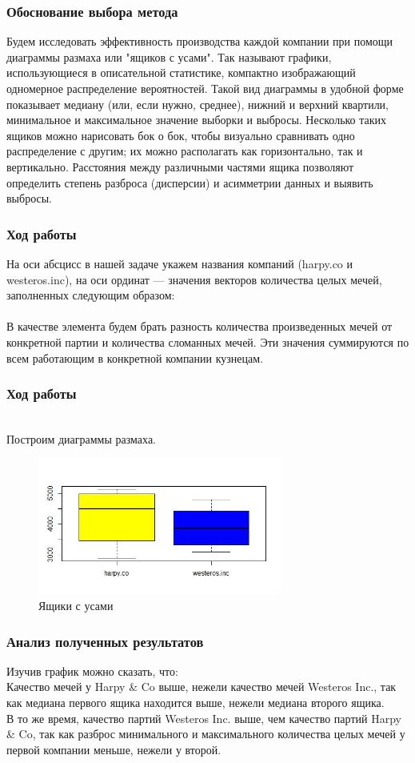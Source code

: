 \documentclass[10pt]{beamer}
\begin{document}
\begin{frame}
\frametitle{Обоснование выбора метода}
Будем исследовать эффективность производства каждой компании при помощи диаграммы размаха или "ящиков с усами". Так называют графики, использующиеся в описательной статистике, компактно изображающий одномерное распределение вероятностей. Такой вид диаграммы в удобной форме показывает медиану (или, если нужно, среднее), нижний и верхний квартили, минимальное и максимальное значение выборки и выбросы. Несколько таких ящиков можно нарисовать бок о бок, чтобы визуально сравнивать одно распределение с другим; их можно располагать как горизонтально, так и вертикально. Расстояния между различными частями ящика позволяют определить степень разброса (дисперсии) и асимметрии данных и выявить выбросы.
\end{frame}

\begin{frame}
\frametitle{Ход работы}
На оси абсцисс в нашей задаче укажем названия компаний (harpy.co и westeros.inc), на оси ординат --- значения векторов количества целых мечей, заполненных следующим образом:\\~\\
В качестве элемента будем брать разность количества произведенных мечей от конкретной партии и количества сломанных мечей. Эти значения суммируются по всем работающим в конкретной компании кузнецам.
\end{frame}

\begin{frame}
\frametitle{Ход работы}
~\\
Построим диаграммы размаха.
\begin{figure}
\includegraphics[width=80mm]{boxes.jpg}
\caption{Ящики с усами}
\label{boxes}
\end{figure}
\end{frame}

\begin{frame}
\frametitle{Анализ полученных результатов}
Изучив график можно сказать, что:\\
Качество мечей у Harpy \& Co выше, нежели качество мечей Westeros Inc., так как медиана первого ящика находится выше, нежели медиана второго ящика.\\
В то же время, качество партий Westeros Inc. выше, чем качество партий Harpy \& Co, так как разброс минимального и максимального количества целых мечей у первой компании меньше, нежели у второй.
\end{frame}
\end{document}
